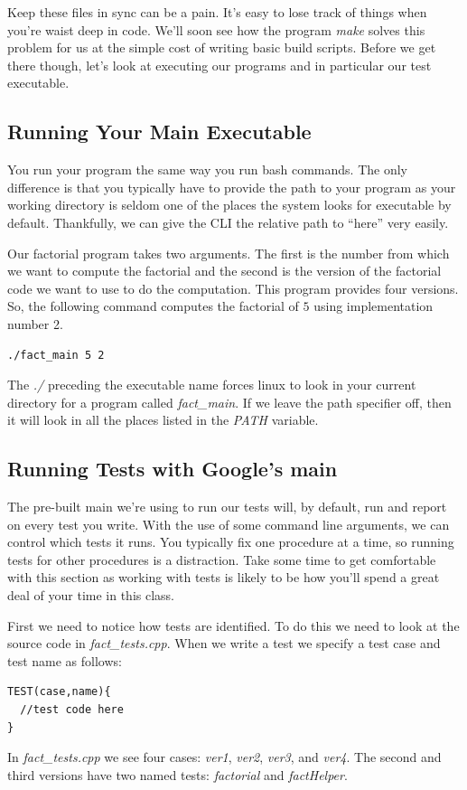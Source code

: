 \documentclass[]{tufte-handout}
\begin{document}
Keep these files in sync can be a pain. It's easy to lose track of things when you're waist deep in code.  We'll soon see how the program \textit{make} solves this problem for us at the simple cost of writing basic build scripts. Before we get there though, let's look at executing our programs and in particular our test executable.

\subsection{Running Your Main Executable}

You run your program the same way you run bash commands. The only difference is that you typically have to provide the path to your program as your working directory is seldom one of the places the system looks for executable by default.  Thankfully, we can give the CLI the relative path to ``here'' very easily.  

Our factorial program takes two arguments. The first is the number from which we want to compute the factorial and the second is the version of the factorial code we want to use to do the computation. This program provides four versions. So, the following command computes the factorial of $5$ using implementation number 2.
\begin{verbatim}
./fact_main 5 2
\end{verbatim}
The \textit{./} preceding the executable name forces linux to look in your current directory for a program called \textit{fact\_main}. If we leave the path specifier off, then it will look in all the places listed in the \textit{PATH} variable. 


\subsection{Running Tests with Google's main}


The pre-built main we're using to run our tests will, by default, run and report on every test you write. With the use of some command line arguments, we can control which tests it runs.  You  typically fix one procedure at a time, so running tests for other procedures is a distraction. Take some time to get comfortable with this section as working with tests is likely to be how you'll spend a great deal of your time in this class. 

First we need to notice how tests are identified. To do this we need to look at the source code in \textit{fact\_tests.cpp}. When we write a test we specify a test case and test name as follows:
\begin{verbatim}
TEST(case,name){ 
  //test code here
}
\end{verbatim}
In \textit{fact\_tests.cpp} we see four cases: \textit{ver1}, \textit{ver2}, \textit{ver3}, and \textit{ver4}. The second and third versions have two named tests: \textit{factorial} and \textit{factHelper}.  
\end{document}
